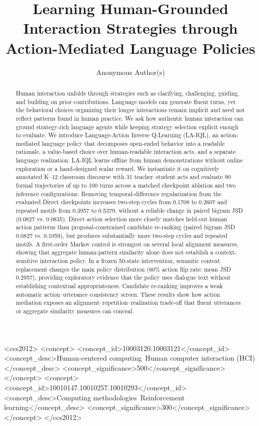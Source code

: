 \documentclass[manuscript,review,anonymous]{acmart}
\title{Learning Human-Grounded Interaction Strategies through Action-Mediated
Language Policies}
\author{Anonymous Author(s)}
\affiliation{\institution{Anonymous Institution}
  \country{Anonymous}}
\begin{document}
\begin{abstract}
Human interaction unfolds through strategies such as clarifying, challenging,
guiding, and building on prior contributions. Language models can generate
fluent turns, yet the behavioral choices organizing their longer interactions
remain implicit and need not reflect patterns found in human practice. We ask
how authentic human interaction can ground strategy-rich language agents while
keeping strategy selection explicit enough to evaluate. We introduce
Language-Action Inverse Q-Learning (LA-IQL), an action-mediated language policy
that decomposes open-ended behavior into a readable rationale, a value-based
choice over human-readable interaction acts, and a separate language
realization. LA-IQL learns offline from human demonstrations without online
exploration or a hand-designed scalar reward. We instantiate it on cognitively
annotated K--12 classroom discourse with 31 teacher--student acts and evaluate
90 formal trajectories of up to 100 turns across a matched checkpoint ablation
and two inference configurations. Removing temporal-difference regularization
from the evaluated Direct checkpoints increases two-step cycles from 0.1708 to 0.2607 and
repeated motifs from 0.3957 to 0.5379, without a reliable change in paired
bigram JSD (0.0827 vs. 0.0835). Direct action selection more closely matches
held-out human action patterns than proposal-constrained candidate re-ranking
(paired bigram JSD 0.0827 vs. 0.1059), but produces substantially more
two-step cycles and repeated motifs.
A first-order Markov control is strongest on several local alignment measures,
showing that aggregate human-pattern similarity alone does not establish a
context-sensitive interaction policy. In a frozen 50-state intervention,
semantic context replacement changes the main policy distribution (60\% action
flip rate; mean JSD 0.2957), providing exploratory evidence that the policy
uses dialogue text without establishing contextual appropriateness. Candidate re-ranking improves a weak
automatic action--utterance consistency screen. These results show how action
mediation exposes an alignment--repetition--realization trade-off that fluent
utterances or aggregate similarity measures can conceal.
\end{abstract}

\begin{CCSXML}
<ccs2012>
 <concept>
  <concept_id>10003120.10003121</concept_id>
  <concept_desc>Human-centered computing~Human computer interaction (HCI)</concept_desc>
  <concept_significance>500</concept_significance>
 </concept>
 <concept>
  <concept_id>10010147.10010257.10010293</concept_id>
  <concept_desc>Computing methodologies~Reinforcement learning</concept_desc>
  <concept_significance>300</concept_significance>
 </concept>
</ccs2012>
\end{CCSXML}
\end{document}
